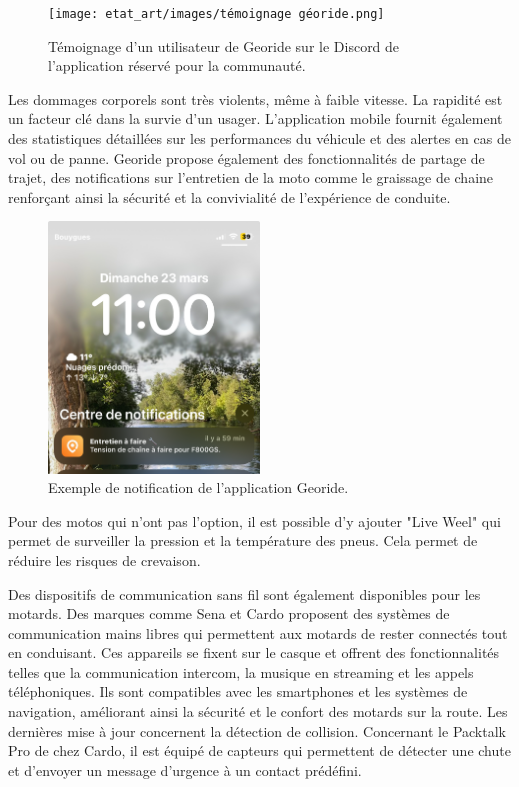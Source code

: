 \begin{figure}[H]
    \centering
    \texttt{[image: etat\_art/images/témoignage géoride.png]} 
    \caption{Témoignage d'un utilisateur de Georide sur le Discord de l'application réservé pour la communauté.}
    \label{temoignage}
\end{figure}
Les dommages corporels sont très violents, même à faible vitesse. La rapidité est un facteur clé dans la survie d'un usager. L’application mobile fournit également des statistiques détaillées sur les performances du véhicule et des alertes en cas de vol ou de panne. Georide propose également des fonctionnalités de partage de trajet, des notifications sur l'entretien de la moto comme le graissage de chaine renforçant ainsi la sécurité et la convivialité de l’expérience de conduite.
\begin{figure}[H]
    \centering
    \includegraphics[width=0.5\textwidth]{images/notification_georide.jpg} 
    \caption{Exemple de notification de l'application Georide.}
\end{figure}
Pour des motos qui n'ont pas l'option, il est possible d'y ajouter "Live Weel" qui permet de surveiller la pression et la température des pneus. Cela permet de réduire les risques de crevaison.
\vspace{0.5cm}

Des dispositifs de communication sans fil sont également disponibles pour les motards. Des marques comme Sena et Cardo\cite{cardo} proposent des systèmes de communication mains libres qui permettent aux motards de rester connectés tout en conduisant. Ces appareils se fixent sur le casque et offrent des fonctionnalités telles que la communication intercom, la musique en streaming et les appels téléphoniques. Ils sont compatibles avec les smartphones et les systèmes de navigation, améliorant ainsi la sécurité et le confort des motards sur la route. Les dernières mise à jour concernent la détection de collision. Concernant le Packtalk Pro de chez Cardo, il est équipé de capteurs qui permettent de détecter une chute et d'envoyer un message d'urgence à un contact prédéfini.\\

